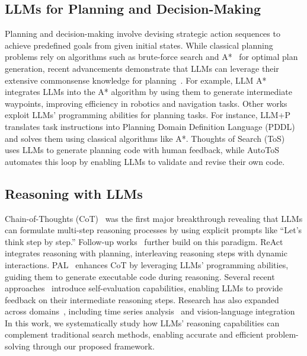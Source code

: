 \subsection{LLMs for Planning and Decision-Making}  
Planning and decision-making involve devising strategic action sequences to achieve predefined goals from given initial states. While classical planning problems rely on algorithms such as brute-force search and A*~\cite{hart1968formal} for optimal plan generation, recent advancements demonstrate that LLMs can leverage their extensive commonsense knowledge for planning~\cite{valmeekam2023planning,xiao2023llm,yao2023react}. 
For example, LLM A*~\cite{xiao2023llm} integrates LLMs into the A* algorithm by using them to generate intermediate waypoints, improving efficiency in robotics and navigation tasks. Other works~\cite{lyu2023faithful,jojic2023gpt,liu2023llm+,katz2024planning,cao2024automating} exploit LLMs' programming abilities for planning tasks. For instance, LLM+P~\cite{liu2023llm+} translates task instructions into Planning Domain Definition Language (PDDL) and solves them using classical algorithms like A*. Thoughts of Search (ToS)~\cite{katz2024planning} uses LLMs to generate planning code with human feedback, while AutoToS~\cite{cao2024automating} automates this loop by enabling LLMs to validate and revise their own code.

\subsection{Reasoning with LLMs}  
Chain-of-Thoughts (CoT)~\cite{wei2022chain} was the first major breakthrough revealing that LLMs can formulate multi-step reasoning processes by using explicit prompts like ``Let's think step by step.'' Follow-up works~\cite{wang2023selfconsistency,yao2023react,zhou2023leasttomost,welleck2023generating,shinn2024reflexion,paul2023refiner} further build on this paradigm. ReAct~\cite{yao2023react} integrates reasoning with planning, interleaving reasoning steps with dynamic interactions. PAL~\cite{gao2023pal} enhances CoT by leveraging LLMs' programming abilities, guiding them to generate executable code during reasoning. 
Several recent approaches~\cite{welleck2023generating,shinn2024reflexion,paul2023refiner} introduce self-evaluation capabilities, enabling LLMs to provide feedback on their intermediate reasoning steps. 
Research has also expanded across domains~\cite{wang2024comprehensive,zhang2024divide,zhang2024does,xu2024llm}, including time series analysis~\cite{lin2024decoding} and vision-language integration~\cite{wu2025lanp}
In this work, we systematically study how LLMs' reasoning capabilities can complement traditional search methods, enabling accurate and efficient problem-solving through our proposed \method framework. 

